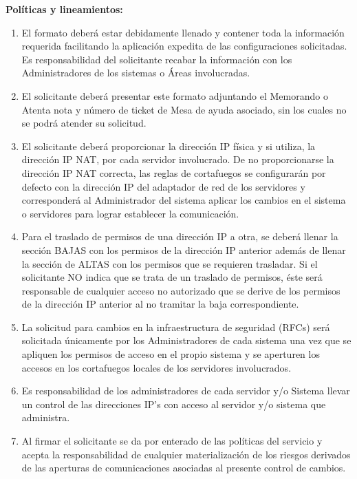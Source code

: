 \documentclass[letterpaper,11pt,landscape]{article}
\begin{document}
\par 
\clearpage
\textbf{\large Políticas y lineamientos:}
{ \small \begin{enumerate}
	        \item El formato deberá estar debidamente llenado y contener toda la información requerida facilitando la aplicación expedita de las configuraciones solicitadas. Es responsabilidad del solicitante recabar la información con los Administradores de los sistemas o Áreas involucradas.
			\item El solicitante deberá presentar este formato adjuntando el Memorando o Atenta nota y número de ticket de Mesa de ayuda asociado, sin los cuales no se podrá atender su solicitud. 
			\item El solicitante deberá proporcionar la dirección IP física y si utiliza, la dirección IP NAT, por cada servidor involucrado. De no proporcionarse la dirección IP NAT correcta, las reglas de cortafuegos se configurarán por defecto con la dirección IP del adaptador de red de los servidores y corresponderá al Administrador del sistema aplicar los cambios en el sistema o servidores para lograr establecer la comunicación.
			\item Para el traslado de permisos de una dirección IP a otra, se deberá llenar la sección BAJAS con los permisos de la dirección IP anterior además de llenar la sección de ALTAS con los permisos que se requieren trasladar. Si el solicitante NO indica que se trata de un traslado de permisos, éste será responsable de cualquier acceso no autorizado que se derive de los permisos de la dirección IP anterior al no tramitar la baja correspondiente.
			\item La solicitud para cambios en la infraestructura de seguridad (RFCs) será solicitada únicamente por los Administradores de cada sistema una vez que se apliquen los permisos de acceso en el propio sistema y se aperturen los accesos en los cortafuegos locales de los servidores involucrados.
			\item Es responsabilidad de los administradores de cada servidor y/o Sistema llevar un control de las direcciones IP’s con acceso al servidor y/o sistema que administra.
			\item Al firmar el solicitante se da por enterado de las políticas del servicio y acepta la responsabilidad de cualquier materialización de los riesgos derivados de las aperturas de comunicaciones asociadas al presente control de cambios.

\end{enumerate}


}
\end{document}
